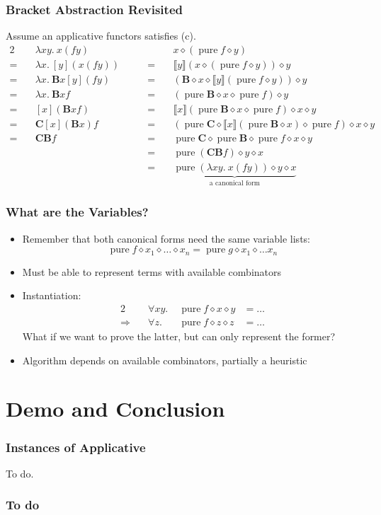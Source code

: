 \documentclass{beamer}
\DeclareMathOperator{\pure}{pure}
\newcommand{\ap}{\diamond}
\newcommand{\lba}[1]{\llbracket #1\rrbracket}
\begin{document}
\begin{frame}
\frametitle{Bracket Abstraction Revisited}

Assume an applicative functors satisfies (c).
\begin{alignat*}{2}
\quad& \lambda x y.\> x (f y) & \quad& x \ap (\pure f \ap y) \\
=\quad& \lambda x.\> [y](x (f y)) & \qquad=\quad& \lba{y}(x \ap (\pure f \ap y)) \ap y \\
=\quad& \lambda x.\> \mathbf{B} x [y](f y) & \qquad=\quad& (\mathbf{B} \ap x \ap \lba{y}(\pure f \ap y)) \ap y \\
=\quad& \lambda x.\> \mathbf{B} x f & \qquad=\quad& (\pure \mathbf{B} \ap x \ap \pure f) \ap y \\
=\quad& [x](\mathbf{B} x f) & \qquad=\quad& \lba{x}(\pure \mathbf{B} \ap x \ap \pure f) \ap x \ap y \\
=\quad& \mathbf{C} [x](\mathbf{B} x) f & \qquad=\quad& (\pure \mathbf{C} \ap \lba{x}(\pure \mathbf{B} \ap x) \ap \pure f) \ap x \ap y \\
=\quad& \mathbf{C B} f & \qquad=\quad& \pure \mathbf{C} \ap \pure \mathbf{B} \ap \pure f \ap x \ap y \\
& & \qquad=\quad& \pure{(\mathbf{C B} f)} \ap y \ap x \\
& & \qquad=\quad& \underbrace{\pure{(\lambda x y.\> x (f y))} \ap y \ap x}_\text{a canonical form}
\end{alignat*}
\end{frame}

\begin{frame}
\frametitle{What are the Variables?}

\begin{itemize}
\item Remember that both canonical forms need the same variable lists:
\[ \pure f \ap x_1 \ap \dots \ap x_n = \pure g \ap x_1 \ap \dots x_n \]
\item Must be able to represent terms with available combinators
\item Instantiation:
\begin{alignat*}{2}
	& \forall x y. \; & \pure f \ap x \ap y &= \dots \\
	\Longrightarrow\quad & \forall z. \; & \pure f \ap z \ap z &= \dots
\end{alignat*}
What if we want to prove the latter, but can only represent the former?
\item Algorithm depends on available combinators, partially a heuristic
\end{itemize}
\end{frame}


\section{Demo and Conclusion} %

\begin{frame}
\frametitle{Instances of Applicative}
To do.
\end{frame}

\begin{frame}
\frametitle{To do}
\end{frame}
\end{document}

